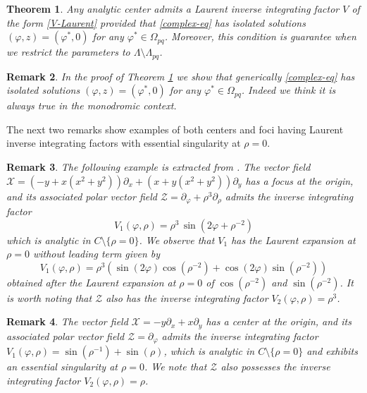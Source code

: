 \documentclass[12pt]{amsart}
\newtheorem {theorem} {Theorem}%
\newtheorem {remark} [theorem]{\sc Remark}
\begin{document}
\begin{theorem}\label{center-V}
Any analytic center admits a Laurent inverse integrating factor $V$ of the form \eqref{V-Laurent} provided that \eqref{complex-eq} has isolated solutions $(\varphi, z) = (\varphi^*, 0)$ for any $\varphi^* \in \Omega_{pq}$. Moreover, this condition is guarantee when we restrict the parameters to $\Lambda \setminus \Lambda_{pq}$.
\end{theorem}

\begin{remark}
{\rm In the proof of Theorem \ref{center-V} we show that generically \eqref{complex-eq} has isolated solutions $(\varphi, z) = (\varphi^*, 0)$ for any $\varphi^* \in \Omega_{pq}$. Indeed we think it is always true in the monodromic context. }
\end{remark}

The next two remarks show examples of both centers and foci having Laurent inverse integrating factors with essential singularity at $\rho=0$.

\begin{remark}
{\rm The following example is extracted from \cite{BerroneGiacomini}. The vector field $\mathcal{X} = (-y + x (x^2+y^2)) \partial_x + (x + y (x^2+y^2)) \partial_y$ has a focus at the origin, and its associated polar vector field $\mathcal{Z} = \partial_{\varphi} + \rho^3 \partial_{\rho}$ admits the inverse integrating factor
\begin{equation}\label{V-focus-esencial}
V_{1}(\varphi, \rho) = \rho^3 \, \sin(2 \varphi + \rho^{-2})
\end{equation}
which is analytic in $C \setminus \{\rho = 0\}$. We observe that $V_1$ has the Laurent expansion at $\rho = 0$ without leading term given by
$$
V_{1}(\varphi, \rho) = \rho^3 \left( \sin(2\varphi) \cos(\rho^{-2})+ \cos(2\varphi) \sin(\rho^{-2}) \right)
$$
obtained after the Laurent expansion at $\rho=0$ of $\cos(\rho^{-2})$ and $\sin(\rho^{-2})$. It is worth noting that $\mathcal{Z}$ also has the inverse integrating factor $V_2(\varphi, \rho) = \rho^3$. }
\end{remark}

\begin{remark}
{\rm The vector field $\mathcal{X} = -y \partial_x + x \partial_y$ has a center at the origin, and its associated polar vector field $\mathcal{Z} = \partial_{\varphi}$ admits the inverse integrating factor $V_1(\varphi, \rho) = \sin(\rho^{-1}) + \sin(\rho)$, which is analytic in $C \setminus \{\rho = 0\}$ and exhibits an essential singularity at $\rho = 0$. We note that $\mathcal{Z}$ also possesses the inverse integrating factor $V_2(\varphi, \rho) = \rho$. }
\end{remark}
\end{document}
